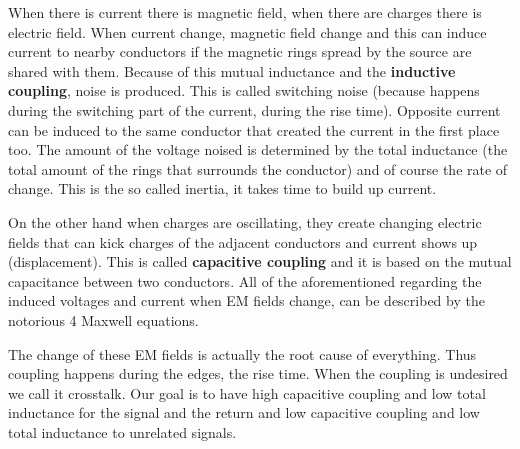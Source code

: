 \documentclass[final]{cubedoc}
\begin{document}
	
	
	
	
	
	
	When there is current there is magnetic field, when there are charges there is electric field. When current change, magnetic field change and this can induce current to nearby conductors if the magnetic rings spread by the source are shared with them. Because of this mutual inductance and the \textbf{inductive coupling}, noise is produced. This is called switching noise (because happens during the switching part of the current, during the rise time). Opposite current can be induced to the same conductor that created the current in the first place too. The amount of the voltage noised is determined by the total inductance (the total amount of the rings that surrounds the conductor) and of course the rate of change. This is the so called inertia, it takes time to build up current. 
	
	On the other hand when charges are oscillating, they create changing electric fields that can kick charges of the adjacent conductors and current shows up (displacement). This is called \textbf{capacitive coupling} and it is based on the mutual capacitance between two conductors. All of the aforementioned regarding the induced voltages and current when EM fields change, can be described by the notorious 4 Maxwell equations.
	
	The change of these EM fields is actually the root cause of everything. Thus coupling happens during the edges, the rise time. When the coupling is undesired we call it crosstalk. Our goal is to have high capacitive coupling and low total inductance for the signal and the return and low capacitive coupling and low total inductance to unrelated signals.
	
\end{document}
